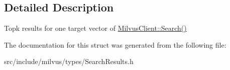 \subsection{Detailed Description}
Topk results for one target vector of \hyperlink{classmilvus_1_1_milvus_client_a46c70fc2b7c386003babd90e02b299d1}{Milvus\+Client\+::\+Search()} 

The documentation for this struct was generated from the following file\+:\begin{DoxyCompactItemize}
\item 
src/include/milvus/types/Search\+Results.\+h\end{DoxyCompactItemize}
